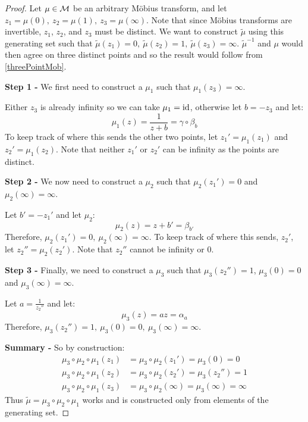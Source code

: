 \documentclass[../main.tex]{subfiles}
\begin{document}
\begin{proof}
  Let $\mu \in \mathcal{M}$ be an arbitrary M\"obius transform, and let $z_1 = \mu(0),\ z_2 = \mu(1),\ z_3 = \mu(\infty)$.
  Note that since M\"obius transforms are invertible, $z_1$, $z_2$, and $z_3$ must be distinct.
  We want to construct $\widetilde{\mu}$ using this generating set such that $\widetilde{\mu}(z_1) = 0,\ \widetilde{\mu}(z_2) = 1,\ \widetilde{\mu}(z_3) = \infty$.
  $\widetilde{\mu}^{-1}$ and $\mu$ would then agree on three distinct points and so the result would follow from \cref{threePointMob}.

  \textbf{Step 1 -}
  We first need to construct a $\mu_1$ such that $\mu_1(z_3) = \infty$.

  Either $z_3$ is already infinity so we can take $\mu_1 = \mathrm{id}$, otherwise let $b = -z_3$ and let:
  \[
    \mu_1(z) = \frac{1}{z+b} = \gamma \circ \beta_b
  \]
  To keep track of where this sends the other two points, let $z_1' = \mu_1(z_1)$ and $z_2' = \mu_1(z_2)$.
  Note that neither $z_1'$ or $z_2'$ can be infinity as the points are distinct.

  \textbf{Step 2 -}
  We now need to construct a $\mu_2$ such that $\mu_2(z_1') = 0$ and $\mu_2(\infty) = \infty$.

  Let $b' = - z_1'$ and let $\mu_2$:
  \[
    \mu_2(z) = z + b' = \beta_{b'}
  \]
  Therefore, $\mu_2(z_1') = 0,\ \mu_2(\infty) = \infty$.
  To keep track of where this sends, $z_2'$, let $z_2'' = \mu_2(z_2')$.
  Note that $z_2''$ cannot be infinity or 0.

  \textbf{Step 3 -}
  Finally, we need to construct a $\mu_3$ such that $\mu_3(z_2'') = 1$, $\mu_3(0) = 0$ and $\mu_3(\infty) = \infty$.

  Let $a = \frac{1}{z_2''}$ and let:
  \[
    \mu_3 (z) = az = \alpha_a
  \]
  Therefore, $\mu_3(z_2'') = 1,\ \mu_3(0) = 0,\ \mu_3(\infty) = \infty$.

  \textbf{Summary -}
  So by construction:
  \begin{align*}
    \mu_3 \circ \mu_2 \circ \mu_1 (z_1) &= \mu_3 \circ \mu_2 (z_1') = \mu_3(0) = 0 \\
    \mu_3 \circ \mu_2 \circ \mu_1 (z_2) &= \mu_3 \circ \mu_2 (z_2') = \mu_3(z_2'') = 1 \\
    \mu_3 \circ \mu_2 \circ \mu_1 (z_3) &= \mu_3 \circ \mu_2 (\infty) = \mu_3(\infty) = \infty
  \end{align*}
  Thus $\widetilde{\mu} = \mu_3 \circ \mu_2 \circ \mu_1$ works and is constructed only from elements of the generating set.
\end{proof}
\end{document}
